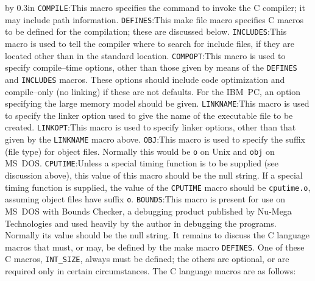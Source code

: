 {\advance\leftskip by 0.3in\noindent
   {\tt COMPILE}:\quad  This macro specifies the command to invoke the C compiler;
                   it may include path information.
\smallbreak
   {\tt DEFINES}:\quad  This make file macro specifies C macros to be defined
                        for the compilation; these are discussed below.  
\smallbreak
   {\tt INCLUDES}:\quad  This macro is used to tell the compiler where
                         to search for include files, if they are located
                         other than in the standard location.  
\smallbreak
   {\tt COMPOPT}:\quad  This macro is used to specify compile--time options,
                        other than those given by means of the 
                        {\tt DEFINES} and {\tt INCLUDES} macros.  These
                        options should include code optimization and
                        compile--only (no linking) if these are not
                        defaults.  For the IBM~PC, an option specifying the
                        large memory model should be given. 
\smallbreak
   {\tt LINKNAME}:\quad  This macro is used to specify the linker option
                        used to give the name of the executable file
                        to be created.
\smallbreak
   {\tt LINKOPT}:\quad  This macro is used to specify linker options, other
                        than that given by the {\tt LINKNAME} macro above.
\smallbreak
   {\tt OBJ}:\quad   This macro is used to specify the suffix (file type)
                     for object files.  Normally this would be {\tt o}
                     on Unix and {\tt obj} on MS~DOS.
\smallbreak
   {\tt CPUTIME}:\quad  Unless a special timing function is to be supplied
                     (see discussion above), this value of this macro should
                      be the null string.  If a special timing function is
                      supplied, the value of the {\tt CPUTIME} macro should 
                      be {\tt cputime.o}, assuming object files have suffix
                      {\tt o}.
\smallbreak
   {\tt BOUNDS}:\quad  This macro is present for use on MS~DOS with Bounds Checker,
                     a debugging product published by Nu-Mega Technologies
                     and used heavily by the author in debugging the programs.
                     Normally its value should be the null string.
\medbreak}
It remains to discuss the C language macros that must, or may, be defined
by the make macro {\tt DEFINES}.  One of these C macros, {\tt INT\_SIZE}, always
must be defined; the others are optional, or are required only in
certain circumstances.  The C language macros are as follows:
